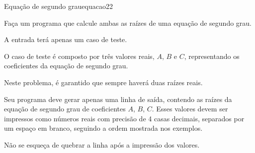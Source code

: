 \documentclass[12pt,a4paper,oneside]{article}
\begin{document}
\begin{problem}{Equação de segundo grau}{equacao2}{2}
 
Faça um programa que calcule ambas as raízes de uma equação de segundo grau.
%

\InputFile

A entrada terá apenas um caso de teste.

O caso de teste é composto por três valores reais, $A$, $B$ e $C$, representando os coeficientes da equação de segundo grau.

\Notes
Neste problema, é garantido que sempre haverá duas raízes reais.


\OutputFile

Seu programa deve gerar apenas uma linha de saída, contendo as raízes da equação de segundo grau de coeficientes $A$, $B$, $C$. Esses valores devem ser impressos como números reais com precisão de 4 casas decimais, separados por um espaço em branco, seguindo a ordem mostrada nos exemplos.


Não se esqueça de quebrar a linha após a impressão dos valores.

\Example

\begin{example}
%
\end{example}

\begin{example}
%
\end{example}

\begin{example}
%
\end{example}



\end{problem}
\end{document}
